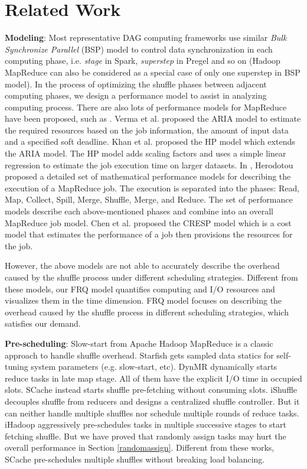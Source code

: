 \section{Related Work}

{\color{black}
\textbf{Modeling}: Most representative DAG computing frameworks use similar \textit{Bulk Synchronize Parallel} (BSP)\cite{valiant1990bridging} model to control data synchronization in each computing phase, i.e. \textit{stage} in Spark, \textit{superstep} in Pregel\cite{malewicz2010pregel} and so on (Hadoop MapReduce can also be considered as a special case of only one superstep in BSP model). 
In the process of optimizing the shuffle phases between adjacent computing phases, we design a performance model to assist in analyzing computing process.
There are also lots of performance models for MapReduce have been proposed, such as \cite{verma2011aria, khan2016hadoop, herodotou2011hadoop, chen2014cresp}.
Verma et al. \cite{verma2011aria} proposed the ARIA model to estimate the required resources based on the job information, the amount of input data and a specified soft deadline.
Khan et al. \cite{khan2016hadoop} proposed the HP model which extends the ARIA model. The HP model adds scaling factors and uses a simple linear regression to estimate the job execution time on larger datasets.
In \cite{herodotou2011hadoop}, Herodotou proposed a detailed set of mathematical performance models for describing the execution of a MapReduce job. The execution is separated into the phases: Read, Map, Collect, Spill, Merge, Shuffle, Merge, and Reduce. The set of performance models describe each above-mentioned phases and combine into an overall MapReduce job model. 
Chen et al. \cite{chen2014cresp} proposed the CRESP model which is a cost model that estimates the performance of a job then 
provisions the resources for the job.

However, the above models are not able to accurately describe the overhead caused by the shuffle process under different scheduling strategies. 
Different from these models, our FRQ model quantifies computing and I/O resources and visualizes them in the time dimension. FRQ model focuses on describing the overhead caused by the shuffle process in different scheduling strategies, which satisfies our demand.
}

\textbf{Pre-scheduling}: Slow-start from Apache Hadoop MapReduce is a classic approach to handle shuffle overhead. 
Starfish \cite{starfish} gets sampled data statics for self-tuning system parameters (e.g. slow-start, etc). 
DynMR \cite{dynmr} dynamically starts reduce tasks in late map stage. 
All of them have the explicit I/O time in occupied slots. 
SCache instead starts shuffle pre-fetching without consuming slots. 
iShuffle \cite{guo2017ishuffle} decouples shuffle from reducers and designs a centralized shuffle controller. 
But it can neither handle multiple shuffles nor schedule multiple rounds of reduce tasks. 
iHadoop \cite{ihadoop} aggressively pre-schedules tasks in multiple successive stages to start fetching shuffle. 
But we have proved that randomly assign tasks may hurt the overall performance in Section \ref{randomassign}. 
Different from these works, SCache pre-schedules multiple shuffles without breaking load balancing. 

